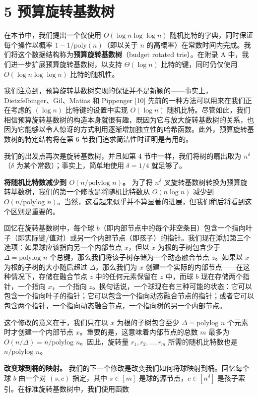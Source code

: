\documentclass[12pt,a4paper]{ctexart}
\theoremstyle{remark}
\begin{document}
\medskip
\section{5 预算旋转基数树}
在本节中，我们提出一个仅使用 $O(\log n\log\log n)$ 随机比特的字典，同时保证每个操作以概率 $1-1/\text{poly}(n)$（即以关于 $n$ 的高概率）在常数时间内完成。我们将这个数据结构称为\textbf{预算旋转基数树}（budget rotated trie）。在附录 A 中，我们进一步扩展预算旋转基数树，以支持 $\Theta(\log n)$ 比特的键，同时仍仅使用 $O(\log n\log\log n)$ 比特的随机性。

我们注意到，预算旋转基数树实现的保证并不是新颖的——事实上，Dietzfelbinger、Gil、Matias 和 Pippenger [10] 先前的一种方法可以用来在我们正在考虑的 $(\log n)$ 比特键的设置中实现 $O(\log n)$ 随机比特。尽管如此，我们相信预算旋转基数树的构造本身就很有趣，既因为它与放大旋转基数树的关系，也因为它能够以令人惊讶的方式利用逐渐增加独立性的哈希函数。此外，预算旋转基数树的特定结构将在第 6 节我们追求简洁性时证明是有用的。

我们的出发点再次是旋转基数树，并且如第 4 节中一样，我们将树的扇出取为 $n^{\delta}$（$\delta$ 为某个常数）；事实上，简单地使用 $\delta=1/4$ 就足够了。

\textbf{将随机比特数减少到 $O(n/\text{polylog } n)$。} 为了将 $n^{\delta}$ 叉旋转基数树转换为预算旋转基数树，我们的第一个修改是将随机比特数从 $O(n\log n)$ 减少到 $O(n/\text{polylog } n)$。当然，这看起来似乎并不算显著的进展，但我们稍后将看到这个区别是重要的。

回忆在旋转基数树中，每个球 $b$（即内部节点中的每个非空条目）包含一个指向叶子（即实际键/值对）或另一个内部节点（即孩子）的指针。我们现在添加第三个选项：如果球应该指向另一个内部节点 $x$，但以 $x$ 为根的子树包含少于 $\Delta=\text{polylog } n$ 个总键，那么我们将该子树存储为一个动态融合节点 $z$。如果以 $x$ 为根的子树的大小随后超过 $\Delta$，那么我们为 $x$ 创建一个实际的内部节点——在这种情况下，存储在融合节点 $z$ 中的任何元素保留在 $z$ 中，而球 $b$ 现在存储两个指针，一个指向 $x$，一个指向 $z$。换句话说，一个球现在有三种可能的状态：它可以包含一个指向叶子的指针；它可以包含一个指向动态融合节点的指针；或者它可以包含两个指针，一个指向动态融合节点，一个指向树的另一个内部节点。

这个修改的意义在于，我们只在以 $x$ 为根的子树包含至少 $\Delta=\text{polylog } n$ 个元素时才创建一个内部节点 $x$。重要的是，这意味着内部节点的总数 $m$ 最多为 $O(n/\Delta)=n/\text{polylog } n$。因此，旋转量 $r_1,r_2,\ldots,r_m$ 所需的随机比特数也是 $n/\text{polylog } n$。

\textbf{改变球到桶的映射。} 我们的下一个修改是改变我们如何将球映射到桶。回忆每个球 $b$ 由一个对 $(s,c)$ 指定，其中 $s\in[m]$ 是球的源节点，$c\in[n^{\delta}]$ 是孩子索引。在标准旋转基数树中，我们使用函数
\end{document}
